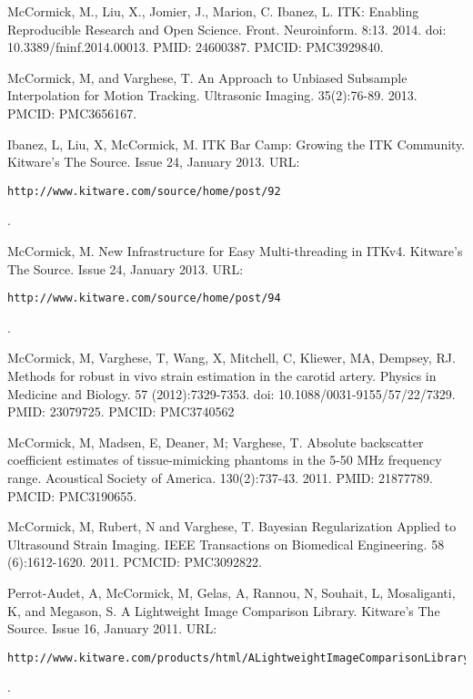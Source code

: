 \documentclass[margin,line]{res}
\begin{document}
\begin{resume}
McCormick, M., Liu, X., Jomier, J., Marion, C. Ibanez, L. ITK: Enabling
Reproducible Research and Open Science.  Front. Neuroinform. 8:13. 2014. doi:
10.3389/fninf.2014.00013. PMID: 24600387. PMCID: PMC3929840.

McCormick, M, and Varghese, T.  An Approach to Unbiased Subsample Interpolation
for Motion Tracking.  Ultrasonic Imaging.  35(2):76-89.  2013.  PMCID: PMC3656167.

Ibanez, L, Liu, X, McCormick, M.  ITK Bar Camp: Growing the ITK Community.  Kitware's
The Source.  Issue 24, January 2013.
\vspace*{-.25in}
URL: \begin{verbatim}http://www.kitware.com/source/home/post/92\end{verbatim}.
\vspace*{-.35in}

McCormick, M.  New Infrastructure for Easy Multi-threading in ITKv4.  Kitware's
The Source.  Issue 24, January 2013.
\vspace*{-.25in}
URL: \begin{verbatim}http://www.kitware.com/source/home/post/94\end{verbatim}.
\vspace*{-.35in}

McCormick, M, Varghese, T, Wang, X, Mitchell, C, Kliewer, MA, Dempsey, RJ.
Methods for robust in vivo strain estimation in the carotid artery.
Physics in Medicine and Biology. 57 (2012):7329-7353.
doi: 10.1088/0031-9155/57/22/7329. PMID: 23079725. PMCID: PMC3740562

McCormick, M, Madsen, E, Deaner, M; Varghese, T.
Absolute backscatter coefficient estimates of tissue-mimicking phantoms in the
5-50 MHz frequency range.
Acoustical Society of America.  130(2):737-43.  2011.
PMID: 21877789.  PMCID: PMC3190655.

McCormick, M, Rubert, N and Varghese, T.  Bayesian Regularization Applied to
Ultrasound Strain Imaging.  IEEE Transactions on Biomedical Engineering.
58 (6):1612-1620.  2011.  PCMCID: PMC3092822.

Perrot-Audet, A, McCormick, M, Gelas, A, Rannou, N, Souhait, L, Mosaliganti, K,
and Megason, S.  A Lightweight Image Comparison Library.  Kitware's The Source.
Issue 16, January 2011.
\vspace*{-.25in}
URL: \begin{verbatim}http://www.kitware.com/products/html/ALightweightImageComparisonLibrary.html\end{verbatim}.
\vspace*{-.35in}


\end{resume}
\end{document}
